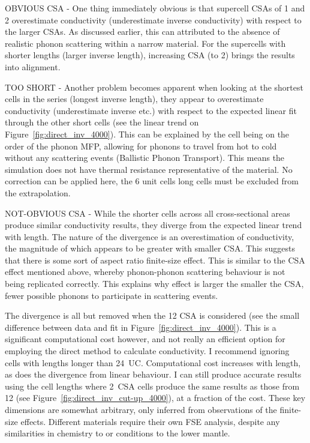 OBVIOUS CSA - One thing immediately obvious is that supercell CSAs of 1 and 2 overestimate conductivity (underestimate inverse conductivity) with respect to the larger CSAs. As discussed earlier, this can attributed to the absence of realistic phonon scattering within a narrow material. For the supercells with shorter lengths (larger inverse length), increasing CSA (to 2) brings the results into alignment. 

TOO SHORT - Another problem becomes apparent when looking at the shortest cells in the series (longest inverse length), they appear to overestimate conductivity (underestimate inverse etc.) with respect to the expected linear fit through the other short cells (see the linear trend on Figure~\ref{fig:direct_inv_4000}). This can be explained by the cell being on the order of the phonon MFP, allowing for phonons to travel from hot to cold without any scattering events (Ballistic Phonon Transport). This means the simulation does not have thermal resistance representative of the material. No correction can be applied here, the 6 unit cells long cells must be excluded from the extrapolation. %


NOT-OBVIOUS CSA - While the shorter cells across all cross-sectional areas produce similar conductivity results, they diverge from the expected linear trend with length. The nature of the divergence is an overestimation of conductivity, the magnitude of which appears to be greater with smaller CSA. This suggests that there is some sort of aspect ratio finite-size effect. This is similar to the CSA effect mentioned above, whereby phonon-phonon scattering behaviour is not being replicated correctly. This explains why effect is larger the smaller the CSA, fewer possible phonons to participate in scattering events. 

The divergence is all but removed when the 12 CSA is considered (see the small difference between data and fit in Figure~\ref{fig:direct_inv_4000}). This is a significant computational cost however, and not really an efficient option for employing the direct method to calculate conductivity. I recommend ignoring cells with lengths longer than 24~UC. Computational cost increases with length, as does the divergence from linear behaviour. I can still produce accurate results using the cell lengths where 2~CSA cells produce the same results as those from 12 (see Figure~\ref{fig:direct_inv_cut-up_4000}), at a fraction of the cost. These key dimensions are somewhat arbitrary, only inferred from observations of the finite-size effects. Different materials require their own FSE analysis, despite any similarities in chemistry to \bdgs or conditions to the lower mantle.

